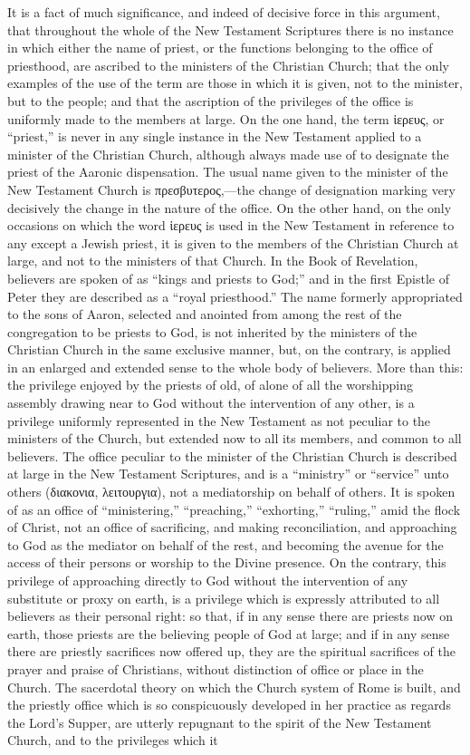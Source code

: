 \documentclass[]{book}
\begin{document}
It is a fact of much significance, and indeed of decisive force in this argument, that throughout the whole of the New Testament Scriptures there is no instance in which either the name of priest, or the functions belonging to the office of priesthood, are ascribed to the ministers of the Christian Church; that the only examples of the use of the term are those in which it is given, not to the minister, but to the people; and that the ascription of the privileges of the office is uniformly made to the members at large. On the one hand, the term ἱερευς, or ``priest,'' is never in any single instance in the New Testament applied to a minister of the Christian Church, although always made use of to designate the priest of the Aaronic dispensation. The usual name given to the minister of the New Testament Church is πρεσβυτερος,---the change of designation marking very decisively the change in the nature of the office. On the other hand, on the only occasions on which the word ἱερευς is used in the New Testament in reference to any except a Jewish priest, it is given to the members of the Christian Church at large, and not to the ministers of that Church. In the Book of Revelation, believers are spoken of as ``kings and priests to God;'' and in the first Epistle of Peter they are described as a ``royal priesthood.'' The name formerly appropriated to the sons of Aaron, selected and anointed from among the rest of the congregation to be priests to God, is not inherited by the ministers of the Christian Church in the same exclusive manner, but, on the contrary, is applied in an enlarged and extended sense to the whole body of believers. More than this: the privilege enjoyed by the priests of old, of alone of all the worshipping assembly drawing near to God without the intervention of any other, is a privilege uniformly represented in the New Testament as not peculiar to the ministers of the Church, but extended now to all its members, and common to all believers. The office peculiar to the minister of the Christian Church is described at large in the New Testament Scriptures, and is a ``ministry'' or ``service'' unto others (διακονια, λειτουργια), not a mediatorship on behalf of others. It is spoken of as an office of ``ministering,'' ``preaching,'' ``exhorting,'' ``ruling,'' amid the flock of Christ, not an office of sacrificing, and making reconciliation, and approaching to God as the mediator on behalf of the rest, and becoming the avenue for the access of their persons or worship to the Divine presence. On the contrary, this privilege of approaching directly to God without the intervention of any substitute or proxy on earth, is a privilege which is expressly attributed to all believers as their personal right: so that, if in any sense there are priests now on earth, those priests are the believing people of God at large; and if in any sense there are priestly sacrifices now offered up, they are the spiritual sacrifices of the prayer and praise of Christians, without distinction of office or place in the Church. The sacerdotal theory on which the Church system of Rome is built, and the priestly office which is so conspicuously developed in her practice as regards the Lord's Supper, are utterly repugnant to the spirit of the New Testament Church, and to the privileges which it 
\end{document}
